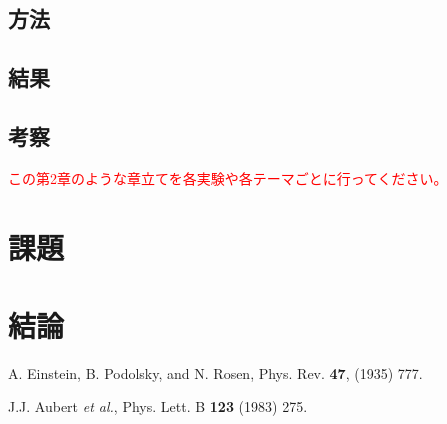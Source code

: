 \documentclass[uplatex,dvipdfmx,a4j,12pt]{jsarticle}
\begin{document}
\subsection{方法}

\subsection{結果}

\subsection{考察}
\textcolor{red}{\textreferencemark この第2章のような章立てを各実験や各テーマごとに行ってください。}

\section{課題}

\section{結論}

\newpage

\begin{thebibliography}{9}

        A. Einstein, B. Podolsky, and N. Rosen, 
        Phys. Rev. \textbf{47}, (1935) 777.

        J.J. Aubert \textit{et al.},
        Phys. Lett. B \textbf{123} (1983) 275.
    
\end{thebibliography}
\end{document}
